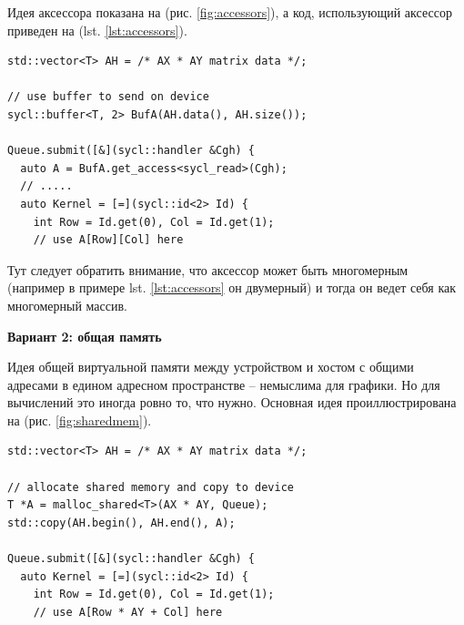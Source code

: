 \documentclass[a4paper,12pt,oneside]{article}
\begin{document}
Идея аксессора показана на (рис. \ref{fig:accessors}), а код, использующий аксессор приведен на (lst. \ref{lst:accessors}).

\begin{lstlisting}[caption={Использование аксессора},label={lst:accessors}]
std::vector<T> AH = /* AX * AY matrix data */;

// use buffer to send on device
sycl::buffer<T, 2> BufA(AH.data(), AH.size());

Queue.submit([&](sycl::handler &Cgh) { 
  auto A = BufA.get_access<sycl_read>(Cgh);
  // .....
  auto Kernel = [=](sycl::id<2> Id) {
    int Row = Id.get(0), Col = Id.get(1);
    // use A[Row][Col] here
\end{lstlisting}

Тут следует обратить внимание, что аксессор может быть многомерным (например в примере lst. \ref{lst:accessors} он двумерный) и тогда он ведет себя как многомерный массив.

\textbf{Вариант 2: общая память}

Идея общей виртуальной памяти между устройством и хостом с общими адресами в едином адресном пространстве -- немыслима для графики.
Но для вычислений это иногда ровно то, что нужно.
Основная идея проиллюстрирована на (рис. \ref{fig:sharedmem}).

\begin{lstlisting}[caption={Использование общей памяти},label={lst:sharedmem}]
std::vector<T> AH = /* AX * AY matrix data */;

// allocate shared memory and copy to device
T *A = malloc_shared<T>(AX * AY, Queue);
std::copy(AH.begin(), AH.end(), A);

Queue.submit([&](sycl::handler &Cgh) { 
  auto Kernel = [=](sycl::id<2> Id) {
    int Row = Id.get(0), Col = Id.get(1);
    // use A[Row * AY + Col] here
\end{lstlisting}
\end{document}
